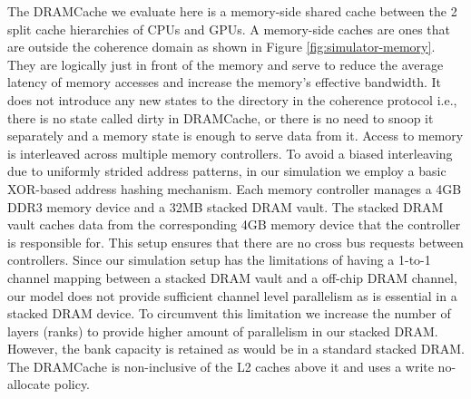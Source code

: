 \par The DRAMCache we evaluate here is a memory-side \cite{skylake} shared cache between the 2 split cache hierarchies of CPUs and GPUs. A memory-side caches are ones that are outside the coherence domain as shown in Figure \ref{fig:simulator-memory}. They are logically just in front of the memory and serve to reduce the average latency of memory accesses and increase the memory's effective bandwidth. It does not introduce any new states to the directory in the coherence protocol i.e., there is no state called dirty in DRAMCache, or there is no need to snoop it separately and a memory state is enough to serve data from it. Access to memory is interleaved across multiple memory controllers. To avoid a biased interleaving due to uniformly strided address patterns, in our simulation we employ a basic XOR-based address hashing mechanism. Each memory controller manages a 4GB DDR3 memory device and a 32MB stacked DRAM vault. The stacked DRAM vault caches data from the corresponding 4GB memory device that the controller is responsible for. This setup ensures that there are no cross bus requests between controllers. Since our simulation setup has the limitations of having a 1-to-1 channel mapping between a stacked DRAM vault and a off-chip DRAM channel, our model does not provide sufficient channel level parallelism as is essential in a stacked DRAM device. To circumvent this limitation we increase the number of layers (ranks) to provide higher amount of parallelism in our stacked DRAM. However, the bank capacity is retained as would be in a standard stacked DRAM. The DRAMCache is non-inclusive  \cite{coherence-dramcache} of the L2 caches above it and uses a write no-allocate policy. 

